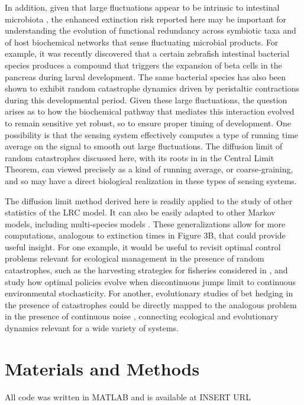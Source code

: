 In addition, given that large fluctuations appear to be intrinsic to intestinal microbiota \cite{trosvik2015biotic, caporaso2011moving,wilesPLOS2016}, the enhanced extinction risk reported here may be important for understanding the evolution of functional redundancy across symbiotic taxa and of host biochemical networks that sense fluctuating microbial products.  For example, it was recently discovered that a certain zebrafish intestinal bacterial species produces a compound that triggers the expansion of beta cells in the pancreas \cite{hill2016conserved} during larval development.  The same bacterial species has also been shown to exhibit random catastrophe dynamics driven by peristaltic contractions \cite{wilesPLOS2016} during this developmental period.  Given these large fluctuations, the question arises as to how the biochemical pathway that mediates this interaction evolved to remain sensitive yet robust, so to ensure proper timing of development.  One possibility is that the sensing system effectively computes a type of running time average on the signal to smooth out large fluctuations.  The diffusion limit of random catastrophes discussed here, with its roots in in the Central Limit Theorem, can viewed precisely as a kind of running average, or coarse-graining, and so may have a direct biological realization in these types of sensing systems.

The diffusion limit method derived here is readily applied to the study of other statistics of the LRC model.  It can also be easily adapted to other Markov models, including multi-species models \cite{bao2011competitive,jacod2013limit}. These generalizations allow for more computations, analogous to extinction times in Figure 3B, that could provide useful insight.  For one example, it would be useful to revisit optimal control problems relevant for ecological management in the presence of random catastrophes, such as the harvesting strategies for fisheries considered in \cite{hanson1998optimal}, and study how optimal policies evolve when discontinuous jumps limit to continuous environmental stochasticity.  For another, evolutionary studies of bet hedging in the presence of catastrophes \cite{visco2010switching}  could be directly mapped to the analogous problem in the presence of continuous noise \cite{melbingerSREP_2015}, connecting ecological and evolutionary dynamics relevant for a wide variety of systems.

\section{Materials and Methods}
 \noindent All code was written in MATLAB and is available at  INSERT URL%
 
